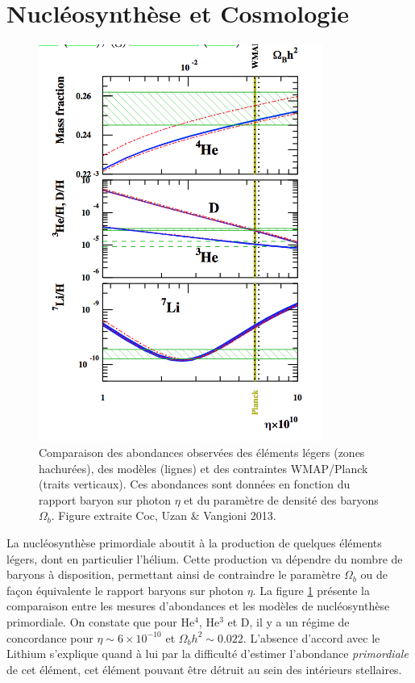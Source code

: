 \section{Nucléosynthèse et Cosmologie}

\begin{figure}[htbp]
	\centering
		\includegraphics[height=13cm]{figs/Nucleo.png}
		\caption{Comparaison des abondances observées des éléments légers (zones hachurées), des modèles (lignes) et des contraintes WMAP/Planck (traits verticaux). Ces abondances sont données en fonction du rapport baryon sur photon  $\eta$ et du paramètre de densité des baryons $\Omega_b$. Figure extraite Coc, Uzan \& Vangioni 2013.}
	\label{f:nucle}
\end{figure}

La nucléosynthèse primordiale aboutit à la production de quelques éléments légers, dont en particulier l'hélium. Cette production va dépendre du nombre de baryons à disposition, permettant ainsi de contraindre le paramètre $\Omega_b$ ou de façon équivalente le rapport baryons sur photon $\eta$. La figure \ref{f:nucle} présente la comparaison entre les mesures d'abondances et les modèles de nucléosynthèse primordiale. On constate que pour He$^4$, He$^3$ et D, il y a un régime de concordance pour $\eta \sim 6\times 10^{-10}$ et $\Omega_b h^2\sim 0.022$. L'absence d'accord avec le Lithium s'explique quand à lui par la difficulté d'estimer l'abondance \textit{primordiale} de cet élément, cet élément pouvant être détruit au sein des intérieurs stellaires.

